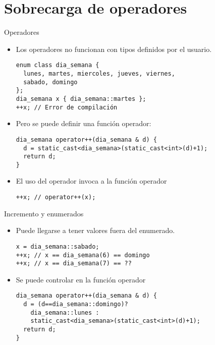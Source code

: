 \section{Sobrecarga de operadores}

\begin{frame}[t,fragile]{Operadores}
\begin{itemize}
  \item Los operadores no funcionan con tipos definidos por el usuario.
       
\begin{lstlisting}
enum class dia_semana { 
  lunes, martes, miercoles, jueves, viernes, 
  sabado, domingo
};
dia_semana x { dia_semana::martes };
++x; // Error de compilación
\end{lstlisting}

  \item Pero se puede definir una función operador:
\begin{lstlisting}
dia_semana operator++(dia_semana & d) {
  d = static_cast<dia_semana>(static_cast<int>(d)+1);
  return d;
}
\end{lstlisting}

  \item El uso del operador invoca a la función operador
\begin{lstlisting}
++x; // operator++(x);
\end{lstlisting}
\end{itemize}

\end{frame}



\begin{frame}[t,fragile]{Incremento y enumerados}
\begin{itemize}
  \item Puede llegarse a tener valores fuera del enumerado.
\begin{lstlisting}
x = dia_semana::sabado;
++x; // x == dia_semana(6) == domingo
++x; // x == dia_semana(7) == ??
\end{lstlisting}

  \item Se puede controlar en la función operador
\begin{lstlisting}
dia_semana operator++(dia_semana & d) {
  d = (d==dia_semana::domingo)?
    dia_semana::lunes :
    static_cast<dia_semana>(static_cast<int>(d)+1);
  return d;
}
\end{lstlisting}
\end{itemize}
\end{frame}

